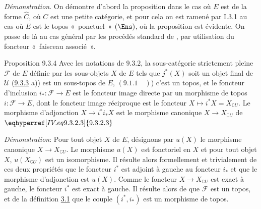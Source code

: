 \documentclass[10pt]{../fichiers-configuration-latex/smfart}
\begin{document}
\noindent \emph{Démonstration}. On démontre d'abord la proposition
dans le cas où $E$ est de la forme $\widehat{C}$, où $C$ est une
petite catégorie, et pour cela on est ramené par I.3.1 au cas où $E$
est le topos « ponctuel »  $(\Ens)$, où la proposition est
évidente. On passe de là au cas général par les
procédés standard de
, par utilisation du foncteur « faisceau associé ».

\begin{enonce*}{Proposition 9.3.4}
Avec les notations de $\hyperref[IV.subsubsec9.3.2]{9.3.2}$, la sous-catégorie
strictement pleine $\mathcal{F}$ de $E$ définie par les sous-objets
$X$ de $E$ tels que $j^{\ast}(X)$ soit un objet final de
$\mathcal{U}$ {\rm (\cf \hyperref[IV.prop9.3.3]{9.3.3} a))} est un sous-topos de
$E$, \ie $(\hyperref[IV.def9.1.1]{9.1.1}\quad )$) c'est un topos, et le foncteur
d'inclusion $i_{\ast}:\mathcal{F}\rightarrow E$ est le foncteur
image directe par un morphisme de topos $i:\mathcal{F}\rightarrow
E$, dont le foncteur image réciproque est le foncteur $X\mapsto
i^{\ast}X=X_{\complement U}$. Le morphisme d'adjonction
$X\rightarrow i^{\ast}i_{\ast}X$ est le morphisme canonique
$X\rightarrow X_{\complement U}$ de $\eqhyperref[IV.eq9.3.2.3]{9.3.2.3}$
\end{enonce*}

\noindent \emph{Démonstration}: Pour tout objet $X$ de $E$,
désignons par $u(X)$ le morphisme canonique $X\rightarrow
X_{\complement U}$. Le morphisme $u(X)$ est fonctoriel en $X$ et
pour tout objet $X$, $u(X_{\complement U})$ est un isomorphisme. Il
résulte alors formellement et trivialement de ces deux propriétés
que le foncteur $i^{\ast}$ est adjoint à gauche au foncteur
$i_{\ast}$ et que le morphisme d'adjonction est $u(X)$. Comme le
foncteur $X\rightarrow X_{\complement U}$ est exact à gauche, le
foncteur $i^{\ast}$ est exact à gauche. Il résulte alors de
 que $\mathcal{F}$ est un topos, et de la
définition \hyperref[IV.def3.1]{3.1} que le couple $(i^{\ast}, i_{\ast})$ est
un morphisme de topos.

\setcounter{subsubsection}{4}
\end{document}
